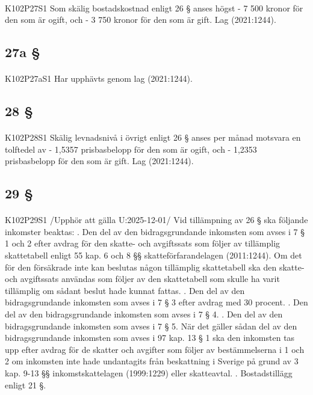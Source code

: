 \documentclass[a4paper,notitlepage,openany,10pt]{book}
\begin{document}
\paragraph*{}
{\tiny K102P27S1}
Som skälig bostadskostnad enligt 26 § anses högst
\newline - 7 500 kronor för den som är ogift, och
\newline - 3 750 kronor för den som är gift.
Lag (2021:1244).
\subsection*{27a §}
\paragraph*{}
{\tiny K102P27aS1}
Har upphävts genom
lag (2021:1244).
\subsection*{28 §}
\paragraph*{}
{\tiny K102P28S1}
Skälig levnadsnivå i övrigt enligt 26 § anses per månad motsvara en tolftedel av
\newline - 1,5357 prisbasbelopp för den som är ogift, och
\newline - 1,2353 prisbasbelopp för den som är gift.
Lag (2021:1244).
\subsection*{29 §}
\paragraph*{}
{\tiny K102P29S1}
/Upphör att gälla U:2025-12-01/
Vid tillämpning av 26 § ska följande inkomster beaktas:
. Den del av den bidragsgrundande inkomsten som avses i 7 § 1 och 2 efter avdrag för den skatte- och avgiftssats som följer av tillämplig skattetabell enligt 55 kap. 6 och 8 §§ skatteförfarandelagen (2011:1244). Om det för den försäkrade inte kan beslutas någon tillämplig skattetabell ska den skatte- och avgiftssats användas som följer av den skattetabell som skulle ha varit tillämplig om sådant beslut hade kunnat fattas.
. Den del av den bidragsgrundande inkomsten som avses i 7 § 3 efter avdrag med 30 procent.
. Den del av den bidragsgrundande inkomsten som avses i 7 § 4.
. Den del av den bidragsgrundande inkomsten som avses i 7 § 5. När det gäller sådan del av den bidragsgrundande inkomsten som avses i 97 kap. 13 § 1 ska den inkomsten tas upp efter avdrag för de skatter och avgifter som följer av bestämmelserna i 1 och 2 om inkomsten inte hade undantagits från beskattning i Sverige på grund av 3 kap. 9-13 §§ inkomstskattelagen (1999:1229) eller skatteavtal.
. Bostadstillägg enligt 21 §.
\end{document}
